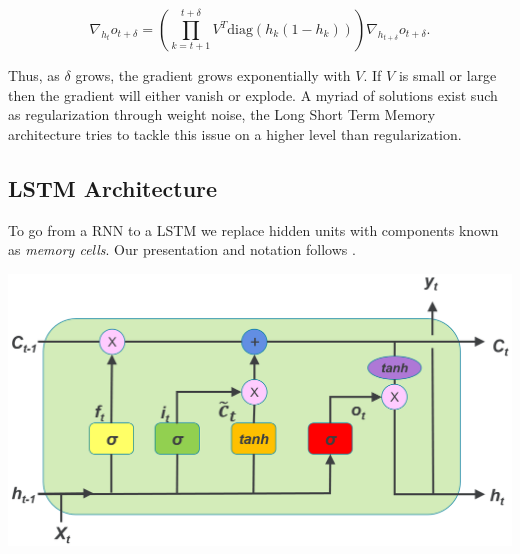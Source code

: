 \begin{equation*}
  \nabla_{h_t} o_{t + \delta} = \left( \prod_{k = t+1}^{t+\delta} V^T
  \text{diag}(h_k(1 - h_k)) \right)\nabla_{h_{t + \delta}}o_{t + \delta}.
\end{equation*}

Thus, as $\delta$ grows, the gradient grows exponentially with $V$. If $V$ is
small or large then the gradient will either vanish or explode. A myriad
of solutions exist such as regularization through weight noise, the Long Short
Term Memory architecture tries to tackle this issue on a higher level than
regularization.
\subsection{LSTM Architecture}
To go from a RNN to a LSTM we replace hidden units with components known as
\textit{memory cells}. Our presentation and notation follows \cite{revieww}.
\begin{center}
    \includegraphics[width =\columnwidth]{lstm.png}
\end{center}

